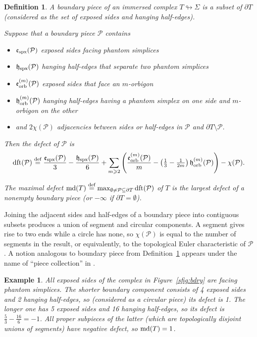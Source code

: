 \documentclass{amsart}
\newtheorem{definition}[conjecture]{Definition}
\newtheorem{example}[conjecture]{Example}
\newcommand{\defeq}{\stackrel{\tn{def}}{=}}
\newcommand{\dft}{\textnormal{dft}}
\newcommand{\md}{\textnormal{md}}
\newcommand{\tn}{\textnormal}
\begin{document}
\begin{definition}\label{def:dft}
A \emph{boundary piece} of an immersed complex $T\looparrowright\Sigma$ is a subset of $\partial T$ (considered as the set of exposed sides and hanging half-edges).

Suppose that a boundary piece $\mathcal{P}$ contains
\begin{itemize}
\item $\mathfrak{e}_\tn{spx}(\mathcal{P})$ exposed sides facing phantom simplices
\item $\mathfrak{h}_\tn{spx}(\mathcal{P})$ hanging half-edges that separate two phantom simplices
\item $\mathfrak{e}^{(m)}_\tn{orb}(\mathcal{P})$ exposed sides that face an $m$-orbigon
\item $\mathfrak{h}^{(m)}_\tn{orb}(\mathcal{P})$ hanging half-edges having a phantom simplex on one side and $m$-orbigon on the other
\item and $2\chi(\mathcal{P})$ adjacencies between sides or half-edges in $\mathcal{P}$ and $\partial T\setminus\mathcal{P}$.
\end{itemize}
Then the \emph{defect} of $\mathcal{P}$ is
\begin{equation*}
\dft(\mathcal{P})\defeq\frac{\mathfrak{e}_\tn{spx}(\mathcal{P})}{3}-\frac{\mathfrak{h}_\tn{spx}(\mathcal{P})}{6}+\sum_{m\geqslant 2}\left(\frac{\mathfrak{e}^{(m)}_\tn{orb}(\mathcal{P})}{m}-\left(\tfrac{1}{3}-\tfrac{1}{2m}\right)\mathfrak{h}^{(m)}_\tn{orb}(\mathcal{P})\right)-\chi(\mathcal{P}).
\end{equation*}

The \emph{maximal defect} $\md(T)\defeq\max_{\emptyset\neq\mathcal{P}\subseteq\partial T}\dft(\mathcal{P})$ of $T$ is the largest defect of a nonempty boundary piece (or $-\infty$ if $\partial T=\emptyset$).
\end{definition}
Joining the adjacent sides and half-edges of a boundary piece into contiguous subsets produces a union of segment and circular components. A segment gives rise to two ends while a circle has none, so $\chi(\mathcal{P})$ is equal to the number of segments in the result, or equivalently, to the topological Euler characteristic of $\mathcal{P}$. A notion analogous to boundary piece from Definition~\ref{def:dft} appears under the name of ``piece collection'' in \cite[\S 5.6]{asymptotic_stats_random_covering_surfaces_MageePuder23}.
\begin{example}
All exposed sides of the complex in Figure~\ref{sfig:bdry} are facing phantom simplices. The shorter boundary component consists of 4 exposed sides and 2 hanging half-edges, so (considered as a circular piece) its defect is 1. The longer one has 5 exposed sides and 16 hanging half-edges, so its defect is $\tfrac{5}{3}-\tfrac{16}{6}=-1$. All proper subpieces of the latter (which are topologically disjoint unions of segments) have negative defect, so $\md(T)=1$.
\end{example}
\end{document}
